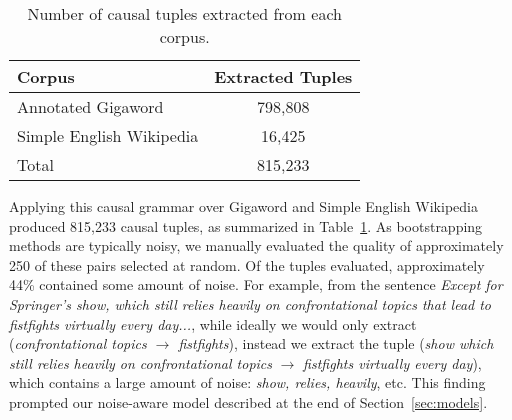 
\begin{table}[t!]
\begin{center}
\begin{footnotesize}
\begin{tabular}{lc}
\hline
Corpus		&	Extracted Tuples		 \\
\hline
Annotated Gigaword	& 798,808 	\\
Simple English Wikipedia		& 16,425 	\\
\hline
Total		& 815,233 	\\
\end{tabular}
\end{footnotesize}
\caption{{\footnotesize Number of causal tuples extracted from each corpus.}} 
\label{tab:causalstats}
\vspace{-4mm}
\end{center}
\end{table}


Applying this causal grammar over Gigaword and Simple English Wikipedia produced %
815,233 causal tuples, as summarized in Table~\ref{tab:causalstats}. As bootstrapping methods are typically noisy, we manually evaluated the quality of approximately 250 of these pairs selected at random.  Of the tuples evaluated, approximately 44\% contained some amount of noise. For example, from the sentence \emph{Except for Springer's show, which still relies heavily on confrontational topics that lead to fistfights virtually every day...}, while ideally we would only extract (\emph{confrontational topics $\rightarrow$ fistfights}), instead we extract the tuple (\emph{show which still relies heavily on confrontational topics} $\rightarrow$ \emph{fistfights virtually every day}), which contains a large amount of noise: \emph{show, relies, heavily}, etc.
This finding prompted our noise-aware model described at the end of Section~\ref{sec:models}.




